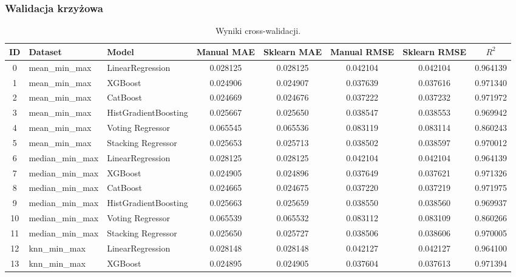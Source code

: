 \documentclass[10pt,letterpaper]{article}
\begin{document}
\newpage
\begin{landscape}
\subsubsection{Walidacja krzyżowa}
\begin{table}[H]
	\centering
	\caption{Wyniki cross-walidacji.}
	\label{tab:results_cross}
	\begin{tabular}{|c|l|l|c|c|c|c|c|}
	
	\textbf{ID} & \textbf{Dataset} & \textbf{Model} & \textbf{Manual MAE} & \textbf{Sklearn MAE} & \textbf{Manual RMSE} & \textbf{Sklearn RMSE} & \textbf{\(R^2\)} \\ 
	\hline
0 & mean\_min\_max & LinearRegression & 0.028125 & 0.028125 & 0.042104 & 0.042104 & 0.964139 \\ \hline
1 & mean\_min\_max & XGBoost & 0.024906 & 0.024907 & 0.037639 & 0.037616 & 0.971340 \\ \hline
2 & mean\_min\_max & CatBoost & 0.024669 & 0.024676 & 0.037222 & 0.037232 & 0.971972 \\ \hline
3 & mean\_min\_max & HistGradientBoosting & 0.025667 & 0.025650 & 0.038547 & 0.038553 & 0.969942 \\ \hline
4 & mean\_min\_max & Voting Regressor & 0.065545 & 0.065536 & 0.083119 & 0.083114 & 0.860243 \\ \hline
5 & mean\_min\_max & Stacking Regressor & 0.025653 & 0.025713 & 0.038502 & 0.038597 & 0.970012 \\ \hline
6 & median\_min\_max & LinearRegression & 0.028125 & 0.028125 & 0.042104 & 0.042104 & 0.964139 \\ \hline
7 & median\_min\_max & XGBoost & 0.024905 & 0.024896 & 0.037649 & 0.037621 & 0.971326 \\ \hline
8 & median\_min\_max & CatBoost & 0.024665 & 0.024675 & 0.037220 & 0.037219 & 0.971975 \\ \hline
9 & median\_min\_max & HistGradientBoosting & 0.025663 & 0.025659 & 0.038550 & 0.038560 & 0.969937 \\ \hline
10 & median\_min\_max & Voting Regressor & 0.065539 & 0.065532 & 0.083112 & 0.083109 & 0.860266 \\ \hline
11 & median\_min\_max & Stacking Regressor & 0.025650 & 0.025727 & 0.038506 & 0.038606 & 0.970005 \\ \hline
12 & knn\_min\_max & LinearRegression & 0.028148 & 0.028148 & 0.042127 & 0.042127 & 0.964100 \\ \hline
13 & knn\_min\_max & XGBoost & 0.024895 & 0.024905 & 0.037604 & 0.037613 & 0.971394 \\ \hline

\end{tabular}
\end{table}
\end{landscape}
\end{document}
